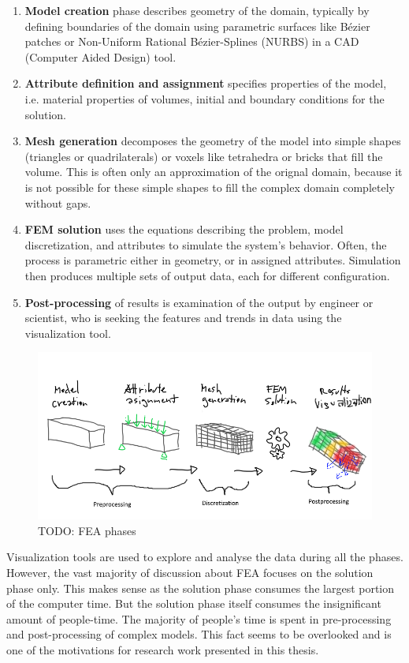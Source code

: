 \begin{enumerate}
    \item \textbf{Model creation} phase describes geometry of the domain, typically by defining boundaries of the domain using parametric surfaces like Bézier patches or Non-Uniform Rational Bézier-Splines (NURBS) \cite{XXX} in a CAD (Computer Aided Design) tool.
    \item \textbf{Attribute definition and assignment} specifies properties of the model, i.e. material properties of volumes, initial and boundary conditions for the solution.
    \item \textbf{Mesh generation} decomposes the geometry of the model into simple shapes (triangles or quadrilaterals) or voxels like tetrahedra or bricks that fill the volume. This is often only an approximation of the orignal domain, because it is not possible for these simple shapes to fill the complex domain completely without gaps.
    \item \textbf{FEM solution} uses the equations describing the problem, model discretization, and attributes to simulate the system's behavior. Often, the process is parametric either in geometry, or in assigned attributes. Simulation then produces multiple sets of output data, each for different configuration.
    \item \textbf{Post-processing} of results is examination of the output by engineer or scientist, who is seeking the features and trends in data using the visualization tool.
\end{enumerate}

\begin{figure}[H]
    \centering
    \includegraphics[width=\textwidth]{figures/FEA-phases}
    \decoRule
    \caption[TODO: ]{TODO: FEA phases}
    \label{fig:FEA-phases}
\end{figure}

Visualization tools are used to explore and analyse the data during all the phases. However, the vast majority of discussion about FEA focuses on the solution phase only. This makes sense as the solution phase consumes the largest portion of the computer time. But the solution phase itself consumes the insignificant amount of people-time. The majority of people's time is spent in pre-processing and post-processing of complex models. This fact seems to be overlooked and is one of the motivations for research work presented in this thesis.


